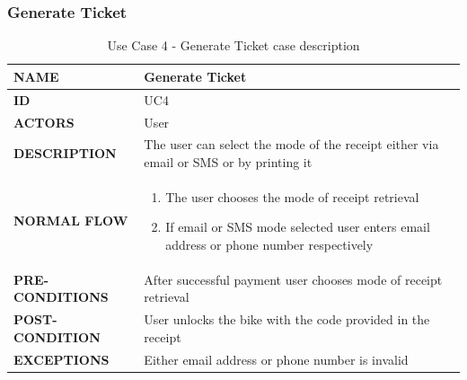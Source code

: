 \subsubsection{Generate Ticket}
\begin{table}[H]
\begin{center}
\renewcommand{\arraystretch}{2}
\begin{tabular}{|p{8cm}|p{8cm}| } 
 \hline
 \textbf{NAME} & Generate Ticket\\ 
 \hline
 \textbf{ID} & UC4  \\ 
 \hline
 \textbf{ACTORS} & User\\
 \hline
 \textbf{DESCRIPTION} & The user can select the mode of the receipt either via email or SMS or by printing it \\  
 \hline
 \textbf{NORMAL FLOW} & \begin{enumerate}
     \item The user chooses the mode of receipt retrieval
     \item If email or SMS mode selected user enters email address or phone number respectively
 \end{enumerate} \\
 \hline
 \textbf{PRE-CONDITIONS} & After successful payment user chooses mode of receipt retrieval\\
 \hline
 \textbf{POST-CONDITION} & User unlocks the bike with the code provided in the receipt\\
 \hline
 \textbf{EXCEPTIONS} & Either email address or phone number is invalid\\
 \hline
\end{tabular}
\caption{\label{demo-table}Use Case 4 - Generate Ticket case description}
\end{center}
\end{table}

